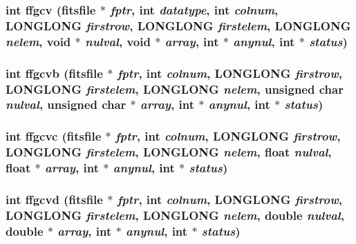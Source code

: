 \subsubsection{\setlength{\rightskip}{0pt plus 5cm}int ffgcv (\bf{fitsfile} $\ast$ {\em fptr}, int {\em datatype}, int {\em colnum}, \bf{LONGLONG} {\em firstrow}, \bf{LONGLONG} {\em firstelem}, \bf{LONGLONG} {\em nelem}, void $\ast$ {\em nulval}, void $\ast$ {\em array}, int $\ast$ {\em anynul}, int $\ast$ {\em status})}\label{fitsio_8h_c55e673b8fb566c96679750dab44a150}


\subsubsection{\setlength{\rightskip}{0pt plus 5cm}int ffgcvb (\bf{fitsfile} $\ast$ {\em fptr}, int {\em colnum}, \bf{LONGLONG} {\em firstrow}, \bf{LONGLONG} {\em firstelem}, \bf{LONGLONG} {\em nelem}, unsigned char {\em nulval}, unsigned char $\ast$ {\em array}, int $\ast$ {\em anynul}, int $\ast$ {\em status})}\label{fitsio_8h_6520868f56bb9899c89670a38f308ebe}


\subsubsection{\setlength{\rightskip}{0pt plus 5cm}int ffgcvc (\bf{fitsfile} $\ast$ {\em fptr}, int {\em colnum}, \bf{LONGLONG} {\em firstrow}, \bf{LONGLONG} {\em firstelem}, \bf{LONGLONG} {\em nelem}, float {\em nulval}, float $\ast$ {\em array}, int $\ast$ {\em anynul}, int $\ast$ {\em status})}\label{fitsio_8h_22ad8e71864412aa1d89aea34a9c57d0}


\subsubsection{\setlength{\rightskip}{0pt plus 5cm}int ffgcvd (\bf{fitsfile} $\ast$ {\em fptr}, int {\em colnum}, \bf{LONGLONG} {\em firstrow}, \bf{LONGLONG} {\em firstelem}, \bf{LONGLONG} {\em nelem}, double {\em nulval}, double $\ast$ {\em array}, int $\ast$ {\em anynul}, int $\ast$ {\em status})}\label{fitsio_8h_9318e8aca439f3c12a22b18912423db8}


